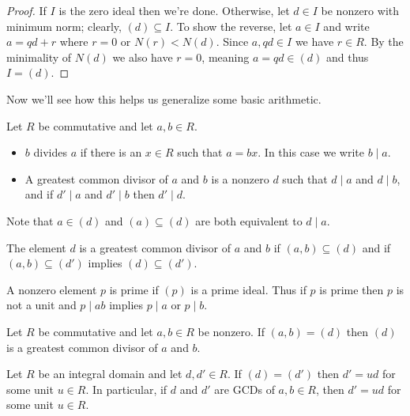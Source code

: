 \documentclass[../m171main.tex]{subfiles}
\begin{document}
\begin{proof}
    If $I$ is the zero ideal then we're done.
    Otherwise, let $d \in I$ be nonzero with minimum norm; clearly, $(d) \subseteq I$.
    To show the reverse, let $a \in I$ and write $a = qd + r$ where $r = 0$ or $N(r) < N(d)$.
    Since $a,qd \in I$ we have $r \in R$.
    By the minimality of $N(d)$ we also have $r = 0$, meaning $a = qd \in (d)$ and thus $I = (d)$.
\end{proof}

Now we'll see how this helps us generalize some basic arithmetic.

\begin{definition}[Divisor]
    Let $R$ be commutative and let $a,b \in R$.
    \begin{itemize}[topsep=0pt]
        \item $b$ divides $a$ if there is an $x \in R$ such that $a = bx$.
        In this case we write $b \mid a$.

        \item A greatest common divisor of $a$ and $b$ is a nonzero $d$ such that $d \mid a$ and $d \mid b$, and if $d' \mid a$ and $d' \mid b$ then $d' \mid d$.
    \end{itemize}
\end{definition}

Note that $a \in (d)$ and $(a) \subseteq (d)$ are both equivalent to $d \mid a$.

\begin{definition}
    The element $d$ is a greatest common divisor of $a$ and $b$ if $(a,b) \subseteq (d)$ and if $(a,b) \subseteq (d')$ implies $(d) \subseteq (d')$.
\end{definition}

\begin{definition}[Prime]
    A nonzero element $p$ is prime if $(p)$ is a prime ideal.
    Thus if $p$ is prime then $p$ is not a unit and $p \mid ab$ implies $p \mid a$ or $p \mid b$.
\end{definition}

\begin{theorem}[]
    Let $R$ be commutative and let $a,b \in R$ be nonzero.
    If $(a,b) = (d)$ then $(d)$ is a greatest common divisor of $a$ and $b$.
\end{theorem}

\begin{theorem}[]
    Let $R$ be an integral domain and let $d, d' \in R$.
    If $(d) = (d')$ then $d' = ud$ for some unit $u \in R$.
    In particular, if $d$ and $d'$ are GCDs of $a,b \in R$, then $d' = ud$ for some unit $u \in R$.
\end{theorem}
\end{document}
